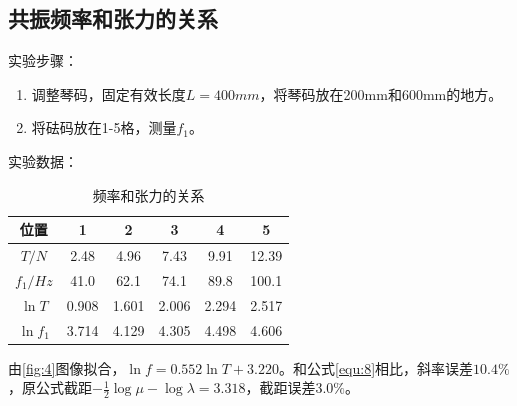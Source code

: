 \documentclass[11pt]{article}
\begin{document}
\subsection{共振频率和张力的关系}
\noindent 实验步骤：
\begin{enumerate}
    \item 调整琴码，固定有效长度$L=400mm$，将琴码放在200mm和600mm的地方。
    \item 将砝码放在1-5格，测量$f_1$。
\end{enumerate}
\noindent 实验数据：
\begin{table}[H]
    \centering
    \caption{频率和张力的关系}
    \begin{tabular}{|c|c|c|c|c|c|}
    \hline
        位置 & 1 & 2 & 3 & 4 & 5 \\ \hline
        $T/N$ & 2.48  & 4.96  & 7.43  & 9.91  & 12.39  \\ \hline
        $f_1/Hz$ & 41.0  & 62.1  & 74.1  & 89.8  & 100.1  \\ \hline
        $\ln T$ & 0.908  & 1.601  & 2.006  & 2.294  & 2.517  \\ \hline
        $\ln f_1$ & 3.714  & 4.129  & 4.305  & 4.498  & 4.606 \\ \hline
    \end{tabular}
\end{table}
    由\cref{fig:4}图像拟合，$\ln f=0.552\ln T+3.220$。和公式\eqref{equ:8}相比，斜率误差$10.4\%$，原公式截距$-\frac{1}{2}\log \mu-\log \lambda=3.318$，截距误差$3.0\%$。
\end{document}
